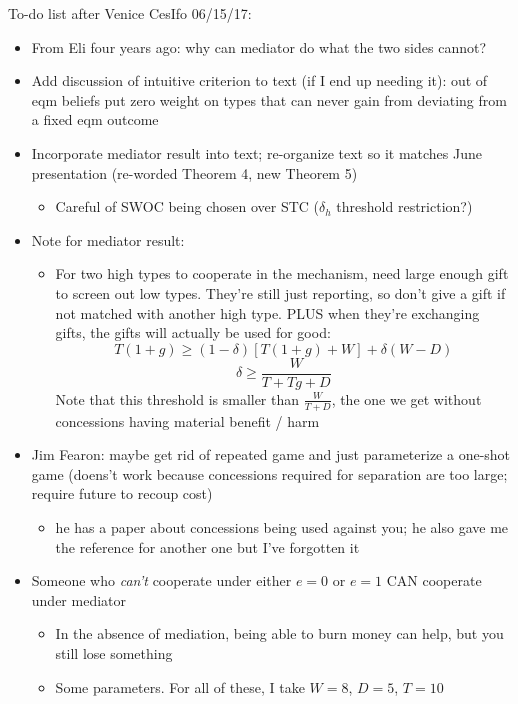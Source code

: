 \documentclass[12pt]{article}
\newcommand{\de}{\delta}
\begin{document}
\newpage
To-do list after Venice CesIfo 06/15/17:
\begin{itemize}
	\item From Eli four years ago: why can mediator do what the two sides cannot?
	\item Add discussion of intuitive criterion to text (if I end up needing it): out of eqm beliefs put zero weight on types that can never gain from deviating from a fixed eqm outcome
	\item Incorporate mediator result into text; re-organize text so it matches June presentation (re-worded Theorem 4, new Theorem 5)
		\begin{itemize}
			\item Careful of SWOC being chosen over STC ($\de_h$ threshold restriction?)
		\end{itemize}
	\item Note for mediator result:
		\begin{itemize}
			\item For two high types to cooperate in the mechanism, need large enough gift to screen out low types. They're still just reporting, so don't give a gift if not matched with another high type. PLUS when they're exchanging gifts, the gifts will actually be used for good:
				\[
				  T(1+g) \geq (1-\de)[T(1+g) + W] + \de (W-D)
				\]
				\[
				  \de \geq \frac{W}{T + Tg + D}
				\]
				Note that this threshold is smaller than $\frac{W}{T + D}$, the one we get without concessions having material benefit / harm
		\end{itemize}
	\item Jim Fearon: maybe get rid of repeated game and just parameterize a one-shot game (doens't work because concessions required for separation are too large; require future to recoup cost)
		\begin{itemize}
			\item he has a paper about concessions being used against you; he also gave me the reference for another one but I've forgotten it
		\end{itemize}
	\item Someone who \textit{can't} cooperate under either $e=0$ or $e=1$ CAN cooperate under mediator
		\begin{itemize}
			\item In the absence of mediation, being able to burn money can help, but you still lose something
			\item Some parameters. For all of these, I take $W=8$, $D=5$, $T=10$
				\begin{itemize}

\end{itemize}
\end{itemize}
\end{itemize}
\end{document}

